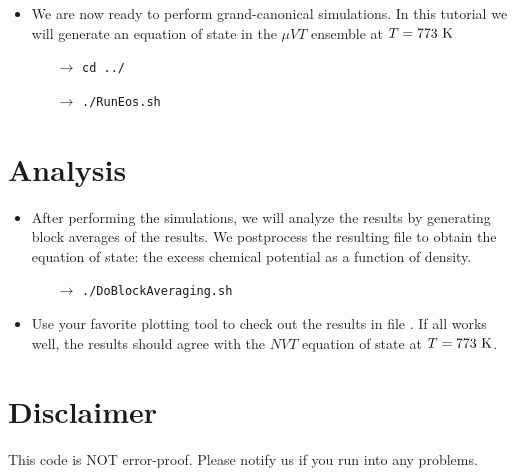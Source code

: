 \documentclass[fleqn,a4paper,12pt]{article}
\begin{document}
\begin{itemize}
{  	.gro} files. Remember that {\tt GromPy} only needs an equilibrated
  	{\em starting} structure (one that does not contain particle overlaps). So as
  	long as we start {\tt GromPy} using a $N\in [1,400]$ structure, it will run fine. For
  	the higher $N$ range we can just generate structures by adding a new LJ
  	particle the last particle on top of e.g. the last particle. Before
  	generating the {\tt .tpr} files, we also need to generate 450 topology
  	({\tt .top}) files.
  	\begin{itemize}
  	  	\item[$\to$] {\tt cd ../gro}
  	  	\item[$\to$] {\tt ln -sf ../mdprod/confout.gro ./W400.gro}
  	  	\item[$\to$] {\tt ./GenerateStartingStructures.sh 1 450 W400.gro}
  	  	\item[$\to$] {\tt cd ../top}
  	  	\item[$\to$] {\tt ./GenerateTopologies.sh 1 450 W400.top}
  	  	\item[$\to$] {\tt cd ../tpr}
  	  	\item[$\to$] {\tt ./GenerateTprs.sh 1 450}
  	\end{itemize}
  	\item We are now ready to perform grand-canonical simulations. In this
  	tutorial we will generate an equation of state in the $\mu VT$ ensemble at
  	$T=773~\rm K$
  	\begin{itemize}
  	  	\item[$\to$] {\tt cd ../}
  	  	\item[$\to$] {\tt ./RunEos.sh}
  	\end{itemize}
\end{itemize}

\section{Analysis}
\begin{itemize}
  	\item After performing the simulations, we will analyze the results by
  	generating block averages of the results. We postprocess the resulting file to obtain the equation of state: the
  	excess chemical potential as a function of density.
  	\begin{itemize}
  	  	\item[$\to$] {\tt ./DoBlockAveraging.sh}
  	\end{itemize}
  	\item Use your favorite plotting tool to check out the results in file
  	. If all works
  	well, the results should agree with the $NVT$ equation of state at $T=773~\rm K$.
\end{itemize}

\section*{Disclaimer}
This code is NOT error-proof. Please notify us if you run into any problems.
\end{document}
